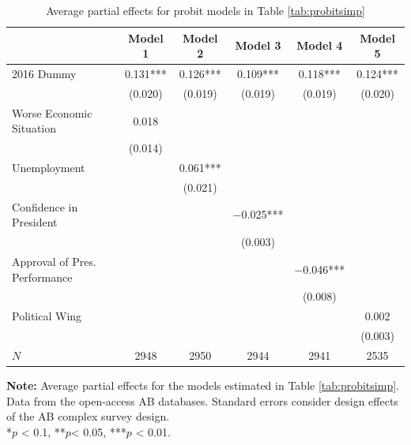 \documentclass[12pt,a4]{article}\usepackage[]{graphicx}\usepackage[]{xcolor}
\begin{document}
\begin{table}[htbp]
\caption{Average partial effects for probit models in Table \ref{tab:probitsimp}}
\label{tab:probitsimpape}

\begin{tabular}[t]{lccccc}
\toprule
  & Model 1 & Model 2 & Model 3 & Model 4 & Model 5\\
\midrule
2016 Dummy & \num{0.131}*** & \num{0.126}*** & \num{0.109}*** & \num{0.118}*** & \num{0.124}***\\
 & (\num{0.020}) & (\num{0.019}) & (\num{0.019}) & (\num{0.019}) & (\num{0.020})\\
Worse Economic Situation & \num{0.018} &  &  &  & \\
 & (\num{0.014}) &  &  &  & \\
Unemployment &  & \num{0.061}*** &  &  & \\
 &  & (\num{0.021}) &  &  & \\
Confidence in President &  &  & \num{-0.025}*** &  & \\
 &  &  & (\num{0.003}) &  & \\
Approval of Pres. Performance &  &  &  & \num{-0.046}*** & \\
 &  &  &  & (\num{0.008}) & \\
Political Wing &  &  &  &  & \num{0.002}\\
 &  &  &  &  & (\num{0.003})\\
\midrule
$N$ & \num{2948} & \num{2950} & \num{2944} & \num{2941} & \num{2535}\\
\bottomrule
\end{tabular}


\vspace{0.25cm}
\textbf{Note:} Average partial effects for the models estimated in Table \ref{tab:probitsimp}. Data from the open-access AB databases. Standard errors consider design effects of the AB complex survey design.\\
*$p$ < 0.1, **$p$< 0.05, ***$p$ < 0.01.
\end{table}
\end{document}
